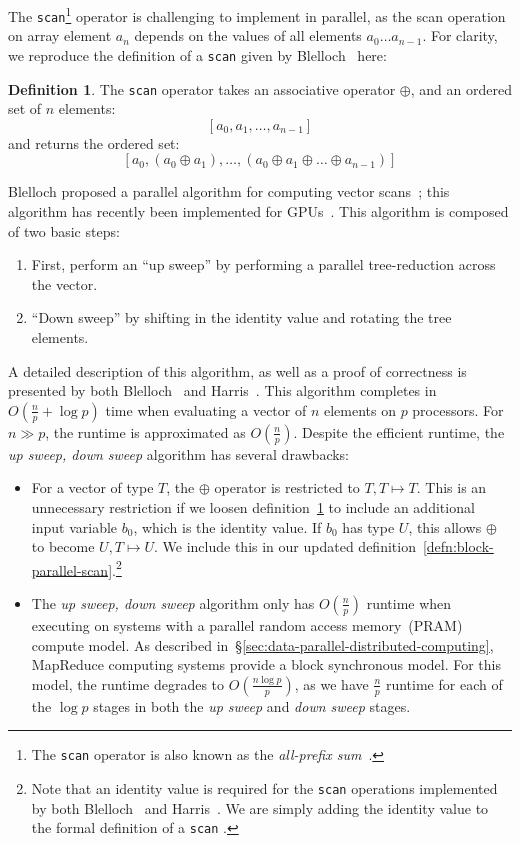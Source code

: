 \documentclass[preprint]{sigplanconf}
\theoremstyle{definition}
\newtheorem{defn}{Definition}
\begin{document}
The \texttt{scan}\footnote{The \texttt{scan} operator is also known as the \emph{all-prefix
sum}~\cite{blelloch93}.} operator is challenging to implement in parallel, as the scan operation on array
element $a_n$ depends on the values of all elements $a_0 \ldots a_{n - 1}$. For clarity, we
reproduce the definition of a \texttt{scan} given by Blelloch~\cite{blelloch93} here:

\begin{defn}
\label{defn:scan}
The \texttt{scan} operator takes an associative operator $\oplus$, and an ordered set of $n$ elements:
$$
[a_0, a_1, \ldots, a_{n - 1}]
$$
and returns the ordered set:
$$
[a_0, (a_0 \oplus a_1), \ldots, (a_0 \oplus a_1 \oplus \ldots \oplus a_{n - 1})]
$$
\end{defn}

Blelloch proposed a parallel algorithm for computing vector scans~\cite{blelloch93}; this algorithm has
recently been implemented for GPUs~\cite{harris07}. This algorithm is composed of two basic steps:

\begin{enumerate}
\item First, perform an ``up sweep'' by performing a parallel tree-reduction across the vector.
\item ``Down sweep'' by shifting in the identity value and rotating the tree elements.
\end{enumerate}

A detailed description of this algorithm, as well as a proof of correctness is presented by both
Blelloch~\cite{blelloch93} and Harris~\cite{harris07}. This algorithm completes in $O(\frac{n}{p} +
\log p)$ time when evaluating a vector of $n$ elements on $p$ processors. For $n \gg p$, the
runtime is approximated as $O(\frac{n}{p})$. Despite the efficient runtime, the \emph{up sweep,
down sweep} algorithm has several drawbacks:

\begin{itemize}
\item For a vector of type $T$, the $\oplus$ operator is restricted to $T, T \mapsto T$. This is an
unnecessary restriction if we loosen definition~\ref{defn:scan} to include an additional input variable
$b_0$, which is the identity value. If $b_0$ has type $U$, this allows $\oplus$ to become $U, T \mapsto
U$. We include this in our updated definition~\ref{defn:block-parallel-scan}.\footnote{Note that an
identity value is required for the \texttt{scan} operations implemented by both Blelloch~\cite{blelloch93}
and Harris~\cite{harris07}. We are simply adding the identity value to the formal definition of a
\texttt{scan} .}
\item The \emph{up sweep, down sweep} algorithm only has $O(\frac{n}{p})$ runtime when executing
on systems with a parallel random access memory~(PRAM) compute model. As described
in~\S\ref{sec:data-parallel-distributed-computing}, MapReduce computing systems provide a block
synchronous model. For this model, the runtime degrades to $O(\frac{n \log p}{p})$, as we have
$\frac{n}{p}$ runtime for each of the $\log p$ stages in both the \emph{up sweep} and \emph{down
sweep} stages.
\end{itemize}
\end{document}
